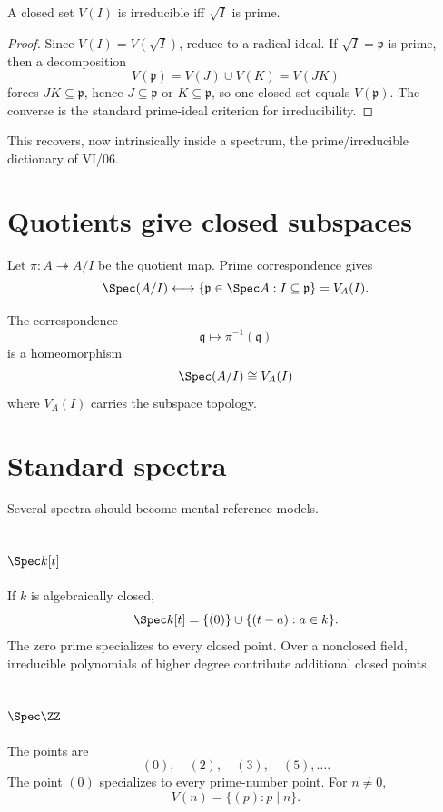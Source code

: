 \begin{proposition}
A closed set $V(I)$ is irreducible iff $\sqrt I$ is prime.
\end{proposition}

\begin{proof}
Since $V(I)=V(\sqrt I)$, reduce to a radical ideal.  If $\sqrt I=\mathfrak p$ is prime,
then a decomposition
\[
V(\mathfrak p)=V(J)\cup V(K)=V(JK)
\]
forces $JK\subseteq\mathfrak p$, hence $J\subseteq\mathfrak p$ or $K\subseteq\mathfrak p$,
so one closed set equals $V(\mathfrak p)$.  The converse is the standard prime-ideal
criterion for irreducibility.
\end{proof}

This recovers, now intrinsically inside a spectrum, the prime/irreducible dictionary of VI/06.

\section{Quotients give closed subspaces}

Let $\pi:A\twoheadrightarrow A/I$ be the quotient map.  Prime correspondence gives
\[
\Spec(A/I)
\longleftrightarrow
\{\mathfrak p\in\Spec A:I\subseteq\mathfrak p\}
=
V_A(I).
\]

\begin{theorem}
The correspondence
\[
\mathfrak q\longmapsto\pi^{-1}(\mathfrak q)
\]
is a homeomorphism
\[
\Spec(A/I)\cong V_A(I)
\]
where $V_A(I)$ carries the subspace topology.
\end{theorem}



\section{Standard spectra}

Several spectra should become mental reference models.

\subsection{$\Spec k[t]$}
If $k$ is algebraically closed,
\[
\Spec k[t]=\{(0)\}\cup\{(t-a):a\in k\}.
\]
The zero prime specializes to every closed point.  Over a nonclosed field, irreducible
polynomials of higher degree contribute additional closed points.

\subsection{$\Spec\ZZ$}
The points are
\[
(0),\quad (2),\quad(3),\quad(5),\dots.
\]
The point $(0)$ specializes to every prime-number point.  For $n\neq0$,
\[
V(n)=\{(p):p\mid n\}.
\]

